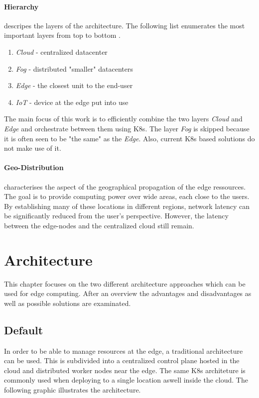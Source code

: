 \documentclass[MSC,Master,english]{twbook}%
\begin{document}
\paragraph{Hierarchy} descripes the layers of the architecture. The following list enumerates the most important layers from top to bottom \cite{intro-edge}.
\begin{enumerate}
    \item \textit{Cloud} - centralized datacenter
    \item \textit{Fog} - distributed "smaller" datacenters
    \item \textit{Edge} - the closest unit to the end-user
    \item \textit{\ac{IoT}} - device at the edge put into use
\end{enumerate}


The main focus of this work is to efficiently combine the two layers \textit{Cloud} and \textit{Edge} and orchestrate between them using \ac{K8s}. The layer \textit{Fog} is skipped because it is often seen to be "the same" as the \textit{Edge}. Also, current \ac{K8s} based solutions do not make use of it. 

\paragraph{Geo-Distribution} characterises the aspect of the geographical propagation of the edge ressources. The goal is to provide computing power over wide areas, each close to the users. By establishing many of these locations in different regions, network latency can be significantly reduced from the user's perspective. However, the latency between the edge-nodes and the centralized cloud still remain.


\section{Architecture}
\label{sec:architecture}
This chapter focuses on the two different architecture approaches which can be used for edge computing. After an overview the advantages and disadvantages as well as possible solutions are examinated.

\subsection{Default}
\label{sec:arch-default}
In order to be able to manage resources at the edge, a traditional architecture can be used. This is subdivided into a centralized control plane hosted in the cloud and distributed worker nodes near the edge. The same \ac{K8s} architeture is commonly used when deploying to a single location aswell inside the cloud. The following graphic illustrates the architecture.
\end{document}
